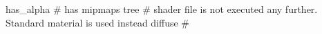 has_alpha
# has mipmaps
tree     # shader file is not executed any further. Standard material is used instead
diffuse  #
